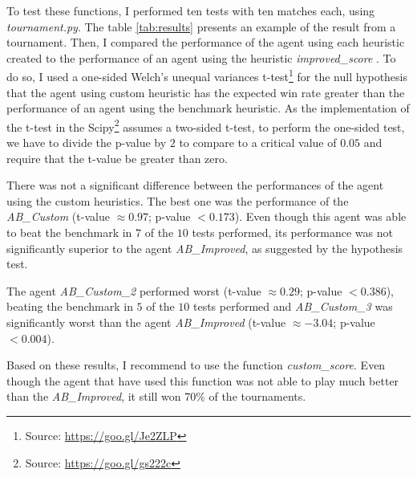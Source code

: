 \documentclass[a4paper]{article}
\begin{document}
To test these functions, I performed ten tests with ten matches each, using \textit{tournament.py}. The table \ref{tab:results} presents an example of the result from a tournament. Then, I compared the performance of the agent using each heuristic created to the performance of an agent using the heuristic \textit{improved\_score} . To do so, I used a one-sided Welch's unequal variances t-test\footnote{Source: \url{https://goo.gl/Je2ZLP}} for the null hypothesis that the agent using custom heuristic has the expected win rate greater than the performance of an agent using the benchmark heuristic. As the implementation of the t-test in the Scipy\footnote{Source: \url{https://goo.gl/gs222c}} assumes a two-sided t-test, to perform the one-sided test, we have to divide the p-value by $2$ to compare to a critical value of $0.05$ and require that the t-value be greater than zero.



There was not a significant difference between the performances of the agent using the custom heuristics. The best one was the performance of the \textit{AB\_Custom} (t-value $\approx 0.97$;  p-value $< 0.173$). Even though this agent was able to beat the benchmark in $7$ of the $10$ tests performed, its performance was not significantly superior to the agent \textit{AB\_Improved}, as suggested by the hypothesis test.

The agent \textit{AB\_Custom\_2} performed worst (t-value $\approx 0.29$;  p-value $< 0.386$), beating the benchmark in $5$ of the $10$ tests performed and \textit{AB\_Custom\_3} was significantly worst than the agent \textit{AB\_Improved} (t-value $\approx -3.04$;  p-value $< 0.004$).

Based on these results, I recommend to use the function \textit{custom\_score}. Even though the agent that have used this function was not able to play much better than the \textit{AB\_Improved}, it still won 70\% of the tournaments.




























\end{document}
